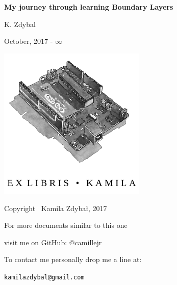 \documentclass[12pt]{report}
\begin{document}
\begin{titlepage}
    \begin{center}

		\vspace*{6cm}
        \LARGE     
		
        \Huge
        \textbf{My journey through learning Boundary Layers}
        
        \vspace*{1cm}
        


        \vspace{2cm}
        
        \LARGE
        K. Zdybal

        \vspace{6cm}
		\Large

		\vspace{1cm}

 		October, 2017 - $\infty$
	\end{center}
\end{titlepage}



\thispagestyle{empty}
\begin{center}
    
\vspace*{4cm}

\includegraphics[width = 70mm]{ex_libris_arduino}

\vspace*{2cm}

Copyright \textcopyright \, Kamila Zdybał, 2017

For more documents similar to this one 

visit me on GitHub: @camillejr

To contact me personally drop me a line at:

\verb|kamilazdybal@gmail.com|

\end{center}
\newpage
\end{document}
